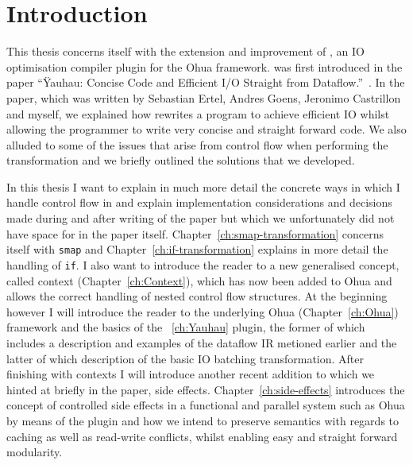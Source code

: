 \chapter{Introduction}

\label{ch:Intro}



This thesis concerns itself with the extension and improvement of \yauhau{}, an IO optimisation compiler plugin for the Ohua framework.
\yauhau{} was first introduced in the paper ``Ÿauhau: Concise Code and Efficient I/O Straight from Dataflow.''~\cite{ErtelGoensAdamEtAl2016}.
In the paper, which was written by Sebastian Ertel, Andres Goens, Jeronimo Castrillon and myself, we explained how \yauhau{} rewrites a program to achieve efficient IO whilst allowing the programmer to write very concise and straight forward code.
We also alluded to some of the issues that arise from control flow when performing the \yauhau{} transformation and we briefly outlined the solutions that we developed.

In this thesis I want to explain in much more detail the concrete ways in which I handle control flow in \yauhau{} and explain implementation considerations and decisions made during and after writing of the paper but which we unfortunately did not have space for in the paper itself.
Chapter~\ref{ch:smap-transformation} concerns itself with \texttt{smap} and Chapter~\ref{ch:if-transformation} explains in more detail the handling of \texttt{if}.
I also want to introduce the reader to a new generalised concept, called context (Chapter~\ref{ch:Context}), which has now been added to Ohua and allows the correct handling of nested control flow structures.
At the beginning however I will introduce the reader to the underlying Ohua (Chapter~\ref{ch:Ohua}) framework and the basics of the \yauhau{}~\ref{ch:Yauhau} plugin, the former of which includes a description and examples of the dataflow IR metioned earlier and the latter of which description of the basic IO batching transformation.
After finishing with contexts I will introduce another recent addition to \yauhau{} which we hinted at briefly in the paper, side effects.
Chapter~\ref{ch:side-effects} introduces the concept of controlled side effects in a functional and parallel system such as Ohua by means of the \yauhau{} plugin and how we intend to preserve semantics with regards to caching as well as read-write conflicts, whilst enabling easy and straight forward modularity.

